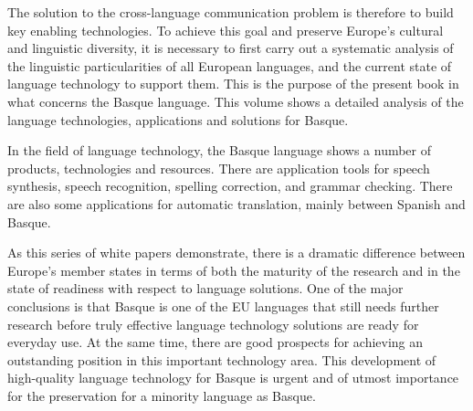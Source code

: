 \begin{multicols}{2}
The solution to the cross-language communication problem is therefore to build key enabling technologies. To achieve this goal and preserve Europe’s cultural and linguistic diversity, it is necessary to first carry out a systematic analysis of the linguistic particularities of all European languages, and the current state of language technology to support them.  This is the purpose of the present book in what concerns the Basque language. This volume shows a detailed analysis of the language technologies, applications and solutions for Basque.

In the field of language technology, the Basque language shows a number of products, technologies and resources. There are application tools for speech synthesis, speech recognition, spelling correction, and grammar checking. There are also some applications for automatic translation, mainly between Spanish and Basque. 


As this series of white papers demonstrate, there is a dramatic difference between Europe’s member states in terms of both the maturity of the research and in the state of readiness with respect to language solutions. One of the major conclusions is that Basque is one of the EU languages that still needs further research before truly effective language technology solutions are ready for everyday use. At the same time, there are good prospects for achieving an outstanding position in this important technology area. This development of high-quality language technology for Basque is urgent and of utmost importance for the preservation for a minority language as Basque.

\end{multicols}

\clearpage



